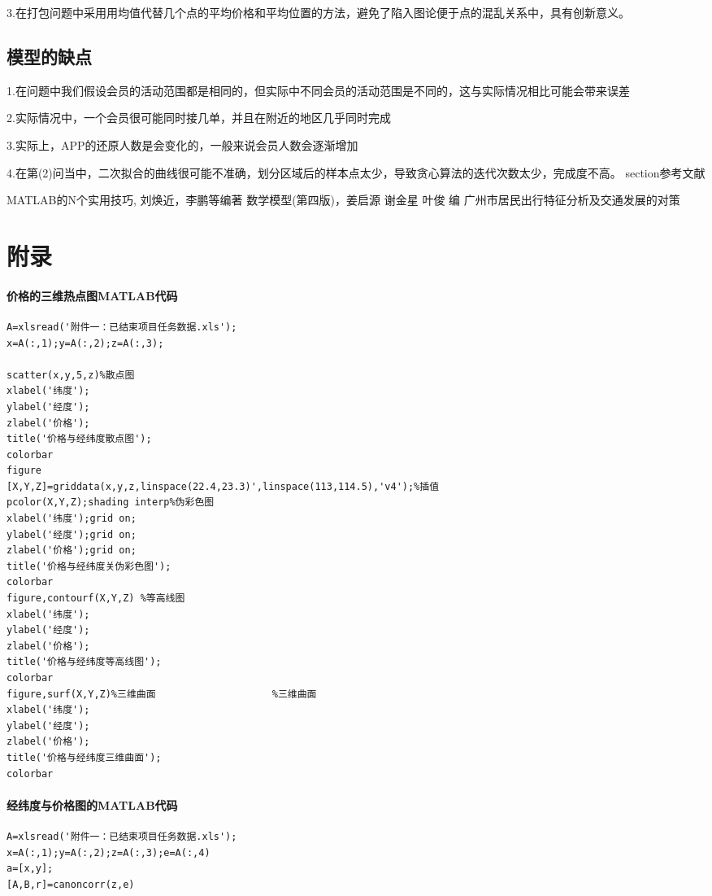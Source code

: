 \documentclass{ctexart}
\begin{document}
3.在打包问题中采用用均值代替几个点的平均价格和平均位置的方法，避免了陷入图论便于点的混乱关系中，具有创新意义。


\subsection{模型的缺点}
1.在问题中我们假设会员的活动范围都是相同的，但实际中不同会员的活动范围是不同的，这与实际情况相比可能会带来误差

2.实际情况中，一个会员很可能同时接几单，并且在附近的地区几乎同时完成

3.实际上，APP的还原人数是会变化的，一般来说会员人数会逐渐增加

4.在第(2)问当中，二次拟合的曲线很可能不准确，划分区域后的样本点太少，导致贪心算法的迭代次数太少，完成度不高。
section{参考文献}
\begin{thebibliography}{9}
 MATLAB的N个实用技巧, 刘焕近，李鹏等编著
 数学模型(第四版)，姜启源 谢金星 叶俊 编
 广州市居民出行特征分析及交通发展的对策
\end{thebibliography}

\newpage  
\appendix 
\section{附录}
\paragraph{价格的三维热点图MATLAB代码}
\begin{verbatim}
A=xlsread('附件一：已结束项目任务数据.xls');
x=A(:,1);y=A(:,2);z=A(:,3);

scatter(x,y,5,z)%散点图
xlabel('纬度');
ylabel('经度');
zlabel('价格');
title('价格与经纬度散点图');
colorbar
figure
[X,Y,Z]=griddata(x,y,z,linspace(22.4,23.3)',linspace(113,114.5),'v4');%插值
pcolor(X,Y,Z);shading interp%伪彩色图
xlabel('纬度');grid on;
ylabel('经度');grid on;
zlabel('价格');grid on;
title('价格与经纬度关伪彩色图');
colorbar
figure,contourf(X,Y,Z) %等高线图
xlabel('纬度');
ylabel('经度');
zlabel('价格');
title('价格与经纬度等高线图');
colorbar
figure,surf(X,Y,Z)%三维曲面                    %三维曲面
xlabel('纬度');
ylabel('经度');
zlabel('价格');
title('价格与经纬度三维曲面');
colorbar
\end{verbatim}
\paragraph{经纬度与价格图的MATLAB代码}
\begin{verbatim}
A=xlsread('附件一：已结束项目任务数据.xls');
x=A(:,1);y=A(:,2);z=A(:,3);e=A(:,4)
a=[x,y];
[A,B,r]=canoncorr(z,e)
\end{verbatim}
\end{document}
